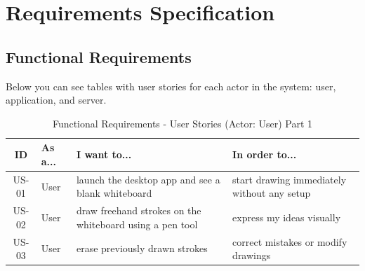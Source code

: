 \documentclass[a4paper,11pt,twoside]{report}
\theoremstyle{definition}
\begin{document}
\section{Requirements Specification}


\subsection{Functional Requirements}

Below you can see tables with user stories for each actor in the system: user, application, and server.
\begin{table}[H]
	\centering
	\caption{Functional Requirements - User Stories (Actor: User) Part 1}
	\begin{tabular}{|c|p{}|p{}|p{}|}
		\hline
		\textbf{ID} & \textbf{As a...} & \textbf{I want to...} & \textbf{In order to...} \\
		\hline
		US-01 & User & launch the desktop app and see a blank whiteboard & start drawing immediately without any setup \\
		\hline
		US-02 & User & draw freehand strokes on the whiteboard using a pen tool & express my ideas visually \\
		\hline
		US-03 & User & erase previously drawn strokes & correct mistakes or modify drawings \\

		

\end{tabular}
\end{table}
\end{document}
